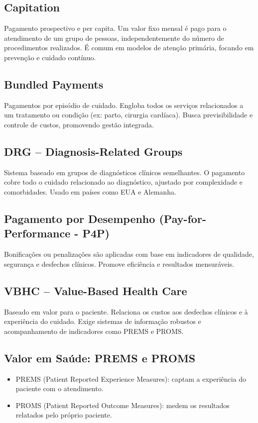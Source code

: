 \documentclass[a4paper,12pt]{article}
\begin{document}
\subsection{Capitation}
\label{sec:org70b54fd}
Pagamento prospectivo e per capita. Um valor fixo mensal é pago para o atendimento de um grupo de pessoas, independentemente do número de procedimentos realizados. É comum em modelos de atenção primária, focando em prevenção e cuidado contínuo.
\subsection{Bundled Payments}
\label{sec:org2bfa266}
Pagamentos por episódio de cuidado. Engloba todos os serviços relacionados a um tratamento ou condição (ex: parto, cirurgia cardíaca). Busca previsibilidade e controle de custos, promovendo gestão integrada.
\subsection{DRG – Diagnosis-Related Groups}
\label{sec:org4c743b9}
Sistema baseado em grupos de diagnósticos clínicos semelhantes. O pagamento cobre todo o cuidado relacionado ao diagnóstico, ajustado por complexidade e comorbidades. Usado em países como EUA e Alemanha.
\subsection{Pagamento por Desempenho (Pay-for-Performance - P4P)}
\label{sec:org6485a03}
Bonificações ou penalizações são aplicadas com base em indicadores de qualidade, segurança e desfechos clínicos. Promove eficiência e resultados mensuráveis.
\subsection{VBHC – Value-Based Health Care}
\label{sec:org1489c64}
Baseado em valor para o paciente. Relaciona os custos aos desfechos clínicos e à experiência do cuidado. Exige sistemas de informação robustos e acompanhamento de indicadores como PREMS e PROMS.
\subsection{Valor em Saúde: PREMS e PROMS}
\label{sec:orga4a00d6}
\begin{itemize}
\item PREMS (Patient Reported Experience Measures): captam a experiência do paciente com o atendimento.
\item PROMS (Patient Reported Outcome Measures): medem os resultados relatados pelo próprio paciente.
\end{itemize}
\end{document}
